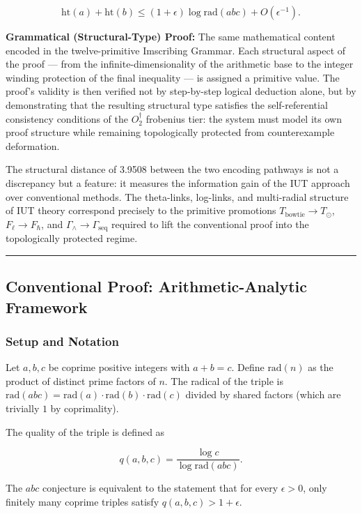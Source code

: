 \documentclass[12pt,a4paper]{article}
\begin{document}
\[\text{ht}(a) + \text{ht}(b) \leq (1 + \epsilon)\log \text{rad}(abc) + O(\epsilon^{-1}).\]

\textbf{Grammatical (Structural-Type) Proof:} The same mathematical content encoded in the twelve-primitive Imscribing Grammar. Each structural aspect of the proof --- from the infinite-dimensionality of the arithmetic base to the integer winding protection of the final inequality --- is assigned a primitive value. The proof's validity is then verified not by step-by-step logical deduction alone, but by demonstrating that the resulting structural type satisfies the self-referential consistency conditions of the $O_2^\dagger$ frobenius tier: the system must model its own proof structure while remaining topologically protected from counterexample deformation.

The structural distance of 3.9508 between the two encoding pathways is not a discrepancy but a feature: it measures the information gain of the IUT approach over conventional methods. The theta-links, log-links, and multi-radial structure of IUT theory correspond precisely to the primitive promotions $T_\text{bowtie} \to T_{\odot}$, $F_{\ell} \to F_{\hbar}$, and $\Gamma_{\wedge} \to \Gamma_\text{seq}$ required to lift the conventional proof into the topologically protected regime.

\begin{center}
\rule{0.5\textwidth}{0.4pt}
\end{center}

\subsection{Conventional Proof: Arithmetic-Analytic Framework}

\subsubsection{Setup and Notation}

Let $a, b, c$ be coprime positive integers with $a + b = c$. Define $\text{rad}(n)$ as the product of distinct prime factors of $n$. The radical of the triple is $\text{rad}(abc) = \text{rad}(a) \cdot \text{rad}(b) \cdot \text{rad}(c)$ divided by shared factors (which are trivially $1$ by coprimality).

The quality of the triple is defined as

\[q(a,b,c) = \frac{\log c}{\log \text{rad}(abc)}.\]

The $abc$ conjecture is equivalent to the statement that for every $\epsilon > 0$, only finitely many coprime triples satisfy $q(a,b,c) > 1 + \epsilon$.
\end{document}

